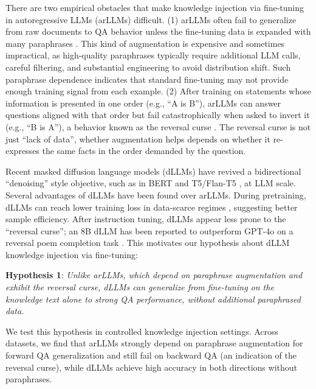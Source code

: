 There are two empirical obstacles that make knowledge injection via fine-tuning in autoregressive LLMs (arLLMs) difficult. (1) arLLMs often fail to generalize from raw documents to QA behavior unless the fine-tuning data is expanded with many paraphrases \citep{ovadia2023fine, mecklenburg2024injecting}. This kind of augmentation is expensive and sometimes impractical, as high-quality paraphrases typically require additional LLM calls, careful filtering, and substantial engineering to avoid distribution shift. Such paraphrase dependence indicates that standard fine-tuning may not provide enough training signal from each example. (2) After training on statements whose information is presented in one order (e.g., “A is B”), arLLMs can answer questions aligned with that order but fail catastrophically when asked to invert it (e.g., “B is A”), a behavior known as the reversal curse \citep{berglund2023reversal, zhu24b, lv-etal-2024-analysis, lin2024delving, guo-etal-2024-mitigating, golovneva2024reverse, lu2024rethinking}. The reversal curse is not just “lack of data”, whether augmentation helps depends on whether it re-expresses the same facts in the order demanded by the question.

Recent masked diffusion language models (dLLMs) \citep{ICLR2025_ce1c1ff5, llada, ye2025dream} have revived a bidirectional “denoising” style objective, such as in BERT and T5/Flan-T5 \cite{devlin2019bert, raffel2020exploring}, at LLM scale. Several advantages of dLLMs have been found over arLLMs. During pretraining, dLLMs can reach lower training loss in data-scarce regimes \citep{prabhudesai2025diffusion, ni2025difflm}, suggesting better sample efficiency. After instruction tuning, dLLMs appear less prone to the “reversal curse”; an 8B dLLM has been reported to outperform GPT-4o on a reversal poem completion task \cite{llada}. This motivates our hypothesis about dLLM knowledge injection via fine-tuning:

\textbf{Hypothesis 1}: \textit{Unlike arLLMs, which depend on paraphrase augmentation and exhibit the reversal curse, dLLMs can generalize from fine-tuning on the knowledge text alone to strong QA performance, without additional paraphrased data.}

\begin{sloppypar}
We test this hypothesis in controlled knowledge injection settings. Across datasets, we find that arLLMs strongly depend on paraphrase augmentation for forward QA generalization and still fail on backward QA (an indication of the reversal curse), while dLLMs achieve high accuracy in both directions without paraphrases.
\end{sloppypar}

